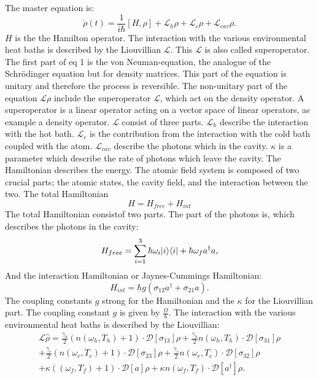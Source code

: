 \documentclass[12pt,a4paper]{article}
\makeatletter
\DeclarePairedDelimiter\bra{\langle}{\rvert}
\DeclarePairedDelimiter\ket{\lvert}{\rangle}
\def\eqref{\@ifstar\@eqref\@@eqref}
\def\@eqref#1{\textup{\tagform@{\ref*{#1}}}}
\def\@@eqref#1{\textup{\tagform@{\ref{#1}}}}
\makeatother
\begin{document}
The master equation is:
\begin{equation}
\dot{\rho}(t)=\frac{1}{i \hbar}[H,\rho]+ \mathcal{L}_{h}\rho+ \mathcal{L}_{c}\rho+ \mathcal{L}_{cav}\rho. \label{1}
\end{equation}
$H$ is the the Hamilton operator. The interaction with the various environmental heat baths is described by the Liouvillian $\mathcal{L}$. This $\mathcal{L}$ is also called superoperator. 
The first part of eq \eqref{1} is the von Neuman-equation,  the analogue of the Schrödinger equation but for density matrices. This part of the equation is unitary and therefore the process is reversible.
The non-unitary part of the equation $\mathcal{L}\rho$ include the superoperator $\mathcal{L}$, which act on the density operator.  A superoperator is a linear operator acting on a vector space of linear operators, as example a density operator.
$\mathcal{L}$ consist of three parts. $\mathcal{L}_h $ describe the interaction with the hot bath.
$\mathcal{L}_c$ is the contribution from the interaction with the cold bath coupled with the atom.
$\mathcal{L}_{cav}$ describe the photons which in the cavity. $\kappa$ is a parameter which describe the rate of photons which leave the cavity.
The Hamiltonian describes the energy. 
The atomic field system is composed of two crucial 
parts; the atomic states, the cavity field, and the interaction between the two.
The total Hamiltonian
\begin{equation}
H=H_{free}+H_{int}
\end{equation}
The total Hamiltonian consistof two parts. The part of the photons is, which describes the photons in the cavity:
\begin{equation}
H_{free}=\sum_{i=1}^3 \hbar \omega_i \ket{i}\bra{i}+\hbar \omega_f a^{\dag}a,\label{2}
\end{equation}
And the interaction Hamiltonian or Jaynes-Cummings Hamiltonian:
\begin{equation}
H_{int}=\hbar g(\sigma_{12}a^{\dag}+\sigma_{21}a).\label{3}
\end{equation}
The coupling constants $g$ strong for the Hamiltonian and the $\kappa$ for the Liouvillian part. 
The coupling constant $g$ is given by $\frac{\Omega}{\hbar}$.
\newpage
The interaction with the various environmental heat baths is described by the Liouvillian:
\begin{equation}
\begin{aligned}
\mathcal{L}\hat{\rho}=\frac{\gamma_h}{2}(n(\omega_h,T_h)+1)   \cdot \mathcal{D}[\sigma_{13}]\rho
+\frac{\gamma_h}{2}n(\omega_h,T_h)\cdot \mathcal{D}[\sigma_{31}]\rho \\
+\frac{\gamma_c}{2}(n(\omega_c,T_c)+1)\cdot \mathcal{D}[\sigma_{23}]\rho
+\frac{\gamma_c}{2}n(\omega_c,T_c) \cdot \mathcal{D}[\sigma_{32}]\rho \\
+\kappa((\omega_f,T_f)+1)	\cdot\mathcal{D}[a]\rho+
\kappa n(\omega_f,T_f)\cdot \mathcal{D}[a^{\dag}]\rho.
\end{aligned}
\end{equation}
\end{document}
